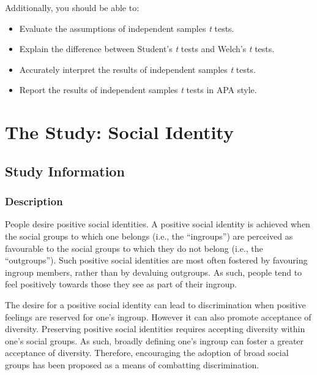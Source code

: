 \documentclass[
]{book}
\providecommand{\tightlist}{%
  \setlength{\itemsep}{0pt}\setlength{\parskip}{0pt}}
\begin{document}
Additionally, you should be able to:

\begin{itemize}
\tightlist
\item
  Evaluate the assumptions of independent samples \emph{t} tests.
\item
  Explain the difference between Student's \emph{t} tests and Welch's \emph{t} tests.
\item
  Accurately interpret the results of independent samples \emph{t} tests.
\item
  Report the results of independent samples \emph{t} tests in APA style.
\end{itemize}

\hypertarget{ist-study}{%
\section{The Study: Social Identity}\label{ist-study}}

\hypertarget{study-information-1}{%
\subsection{Study Information}\label{study-information-1}}

\hypertarget{description-1}{%
\subsubsection{Description}\label{description-1}}

People desire positive social identities. A positive social identity is achieved when the social groups to which one belongs (i.e., the ``ingroups'') are perceived as favourable to the social groups to which they do not belong (i.e., the ``outgroups''). Such positive social identities are most often fostered by favouring ingroup members, rather than by devaluing outgroups. As such, people tend to feel positively towards those they see as part of their ingroup.

The desire for a positive social identity can lead to discrimination when positive feelings are reserved for one's ingroup. However it can also promote acceptance of diversity. Preserving positive social identities requires accepting diversity within one's social groups. As such, broadly defining one's ingroup can foster a greater acceptance of diversity. Therefore, encouraging the adoption of broad social groups has been proposed as a means of combatting discrimination.
\end{document}
